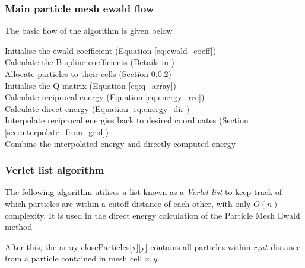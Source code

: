 \documentclass[pdftex,twoside,a4paper]{report}
\newcommand{\pmem}{Particle Mesh Ewald method}
\begin{document}
\subsubsection{Main particle mesh ewald flow}
The basic flow of the algorithm is given below\\ \newline
\begin{algorithm}[H]
\SetLine
{}
Initialise the ewald coefficient (Equation \ref{eq:ewald_coeff})\\
Calculate the B spline coefficients (Details in \cite{essmann:8577} \cite{lee05})\\
Allocate particles to their cells (Section \ref{sec:verlet})\\
Initialise the Q matrix (Equation \ref{eq:q_array})\\
Calculate reciprocal energy (Equation \ref{eq:energy_rec})\\
Calculate direct energy (Equation \ref{eq:energy_dir})\\
Interpolate reciprocal energies back to desired coordinates (Section \ref{sec:interpolate_from_grid})\\
Combine the interpolated energy and directly computed energy
\end{algorithm}

\subsubsection{Verlet list algorithm}
\label{sec:verlet}
The following algorithm utilises a list known as a \emph{Verlet list} to keep track of which particles are within a cutoff distance of each other, with only $O(n)$ complexity. It is used in the direct energy calculation of the \pmem{}\\
\begin{algorithm}[H]
\SetLine
{}
\end{algorithm}
After this, the array closeParticles[x][y] contains all particles within $r_cut$ distance from a particle contained in mesh cell $x,y$.
\end{document}
